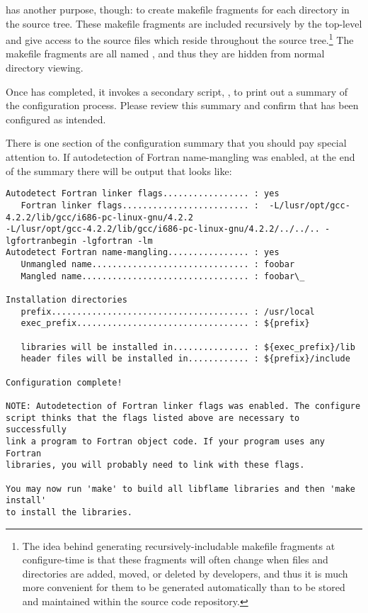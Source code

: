 \configure has another purpose, though: to create makefile fragments for each
directory in the source tree.
These makefile fragments are included recursively by the top-level \makefile
and give \make access to the source files which reside throughout the source
tree.\footnote{
The idea behind generating recursively-includable makefile fragments at
configure-time is that these fragments will often change when files and
directories are added, moved, or deleted by \libflame developers, and thus
it is much more convenient for them to be generated automatically than to be
stored and maintained within the source code repository.}
The makefile fragments are all named \fragmentmkns, and thus they are hidden
from normal directory viewing.

Once \configure has completed, it invokes a secondary script, \postconfigurens,
to print out a summary of the configuration process.
Please review this summary and confirm that \libflame has been configured as
intended.

There is one section of the configuration summary that you should pay special
attention to.
If autodetection of Fortran name-mangling was enabled, at the end of the summary
there will be output that looks like:

\begin{Verbatim}[frame=single,framesep=2.5mm,xleftmargin=5mm,commandchars=\\\{\},fontsize=\footnotesize]
Autodetect Fortran linker flags................. : yes
   Fortran linker flags......................... :  -L/lusr/opt/gcc-4.2.2/lib/gcc/i686-pc-linux-gnu/4.2.2
-L/lusr/opt/gcc-4.2.2/lib/gcc/i686-pc-linux-gnu/4.2.2/../../.. -lgfortranbegin -lgfortran -lm
Autodetect Fortran name-mangling................ : yes
   Unmangled name............................... : foobar
   Mangled name................................. : foobar\_

Installation directories
   prefix....................................... : /usr/local
   exec_prefix.................................. : ${prefix}

   libraries will be installed in............... : ${exec_prefix}/lib
   header files will be installed in............ : ${prefix}/include

Configuration complete!

NOTE: Autodetection of Fortran linker flags was enabled. The configure
script thinks that the flags listed above are necessary to successfully
link a program to Fortran object code. If your program uses any Fortran
libraries, you will probably need to link with these flags.

You may now run 'make' to build all libflame libraries and then 'make install'
to install the libraries.
\end{Verbatim}

